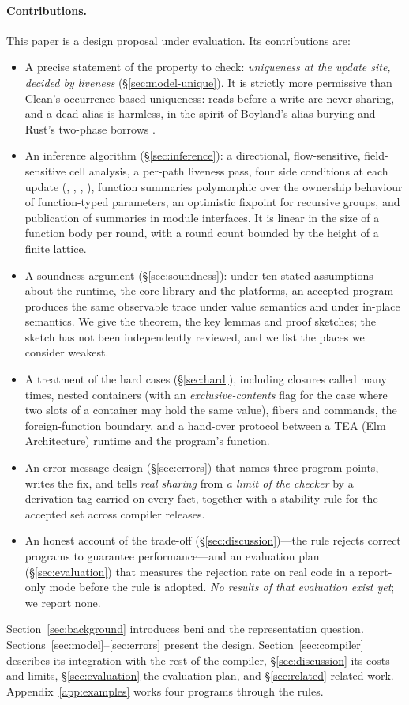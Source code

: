 \paragraph{Contributions.}
This paper is a design proposal under evaluation. Its contributions are:
\begin{itemize}
\item A precise statement of the property to check: \emph{uniqueness at the update site, decided by
liveness} (\S\ref{sec:model-unique}). It is strictly more permissive than Clean's occurrence-based
uniqueness: reads before a write are never sharing, and a dead alias is harmless, in the spirit of
Boyland's alias burying \citep{boyland2001alias} and Rust's two-phase borrows \citep{rfc2025}.
\item An inference algorithm (\S\ref{sec:inference}): a directional, flow-sensitive,
field-sensitive cell analysis, a per-path liveness pass, four side conditions at each update
(\Known, \Unescaped, \Dead, \Disjoint), function summaries polymorphic over the ownership
behaviour of function-typed parameters, an optimistic fixpoint for recursive groups, and
publication of summaries in module interfaces. It is linear in the size of a function body per
round, with a round count bounded by the height of a finite lattice.
\item A soundness argument (\S\ref{sec:soundness}): under ten stated assumptions about the
runtime, the core library and the platforms, an accepted program produces the same observable
trace under value semantics and under in-place semantics. We give the theorem, the key lemmas and
proof sketches; the sketch has not been independently reviewed, and we list the places we
consider weakest.
\item A treatment of the hard cases (\S\ref{sec:hard}), including closures called many times,
nested containers (with an \emph{exclusive-contents} flag for the case where two slots of a
container may hold the same value), fibers and commands, the foreign-function boundary, and a
hand-over protocol between a TEA (Elm Architecture) runtime and the program's 
function.
\item An error-message design (\S\ref{sec:errors}) that names three program points, writes the
fix, and tells \emph{real sharing} from \emph{a limit of the checker} by a derivation tag carried
on every fact, together with a stability rule for the accepted set across compiler releases.
\item An honest account of the trade-off (\S\ref{sec:discussion})---the rule rejects correct
programs to guarantee performance---and an evaluation plan (\S\ref{sec:evaluation}) that measures
the rejection rate on real code in a report-only mode before the rule is adopted. \emph{No results
of that evaluation exist yet}; we report none.
\end{itemize}

Section~\ref{sec:background} introduces beni and the representation question.
Sections~\ref{sec:model}--\ref{sec:errors} present the design. Section~\ref{sec:compiler}
describes its integration with the rest of the compiler, \S\ref{sec:discussion} its costs and
limits, \S\ref{sec:evaluation} the evaluation plan, and \S\ref{sec:related} related work.
Appendix~\ref{app:examples} works four programs through the rules.

